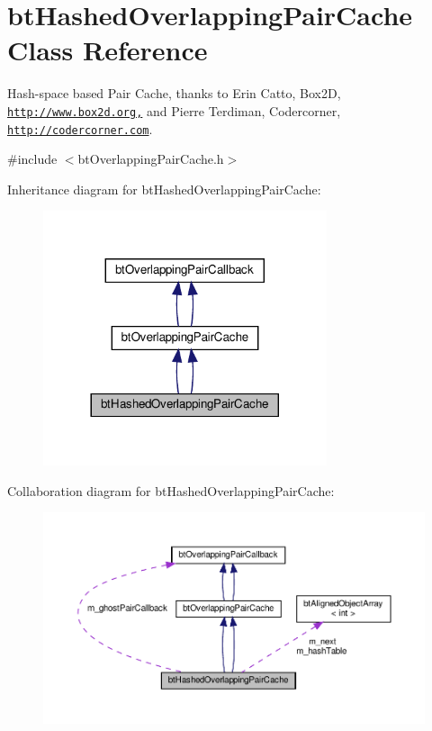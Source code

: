 \hypertarget{classbtHashedOverlappingPairCache}{}\section{bt\+Hashed\+Overlapping\+Pair\+Cache Class Reference}
\label{classbtHashedOverlappingPairCache}


Hash-\/space based Pair Cache, thanks to Erin Catto, Box2D, \href{http://www.box2d.org,}{\tt http\+://www.\+box2d.\+org,} and Pierre Terdiman, Codercorner, \href{http://codercorner.com}{\tt http\+://codercorner.\+com}.  




{\ttfamily \#include $<$bt\+Overlapping\+Pair\+Cache.\+h$>$}



Inheritance diagram for bt\+Hashed\+Overlapping\+Pair\+Cache\+:
\nopagebreak
\begin{figure}[H]
\begin{center}
\leavevmode
\includegraphics[width=236pt]{classbtHashedOverlappingPairCache__inherit__graph}
\end{center}
\end{figure}


Collaboration diagram for bt\+Hashed\+Overlapping\+Pair\+Cache\+:
\nopagebreak
\begin{figure}[H]
\begin{center}
\leavevmode
\includegraphics[width=350pt]{classbtHashedOverlappingPairCache__coll__graph}
\end{center}
\end{figure}
